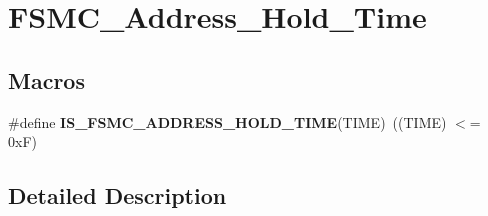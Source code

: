 \hypertarget{group___f_s_m_c___address___hold___time}{\section{F\-S\-M\-C\-\_\-\-Address\-\_\-\-Hold\-\_\-\-Time}
\label{group___f_s_m_c___address___hold___time}
}
\subsection*{Macros}
\begin{DoxyCompactItemize}
\item 
\hypertarget{group___f_s_m_c___address___hold___time_gae7d031a5b95ad00acf67e9bc95064998}{\#define {\bfseries I\-S\-\_\-\-F\-S\-M\-C\-\_\-\-A\-D\-D\-R\-E\-S\-S\-\_\-\-H\-O\-L\-D\-\_\-\-T\-I\-M\-E}(T\-I\-M\-E)~((T\-I\-M\-E) $<$= 0x\-F)}\label{group___f_s_m_c___address___hold___time_gae7d031a5b95ad00acf67e9bc95064998}

\end{DoxyCompactItemize}


\subsection{Detailed Description}
